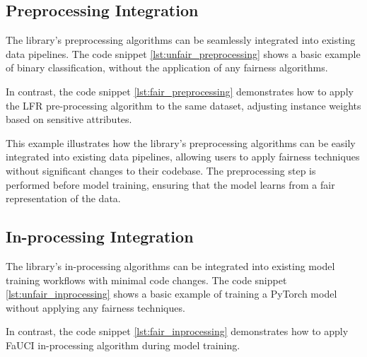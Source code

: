 \documentclass[12pt,a4paper,openright,twoside]{book}
\begin{document}
\subsection{Preprocessing Integration}
The library's preprocessing algorithms can be seamlessly integrated into existing data pipelines. The code snippet \ref{lst:unfair_preprocessing} shows a basic example of binary classification, without the application of any fairness algorithms.



In contrast, the code snippet \ref{lst:fair_preprocessing} demonstrates how to apply the LFR pre-processing algorithm to the same dataset, adjusting instance weights based on sensitive attributes.



This example illustrates how the library's preprocessing algorithms can be easily integrated into existing data pipelines, allowing users to apply fairness techniques without significant changes to their codebase. The preprocessing step is performed before model training, ensuring that the model learns from a fair representation of the data.

\subsection{In-processing Integration}

The library's in-processing algorithms can be integrated into existing model training workflows with minimal code changes. The code snippet \ref{lst:unfair_inprocessing} shows a basic example of training a PyTorch model without applying any fairness techniques.



In contrast, the code snippet \ref{lst:fair_inprocessing} demonstrates how to apply FaUCI in-processing algorithm during model training.


\end{document}
